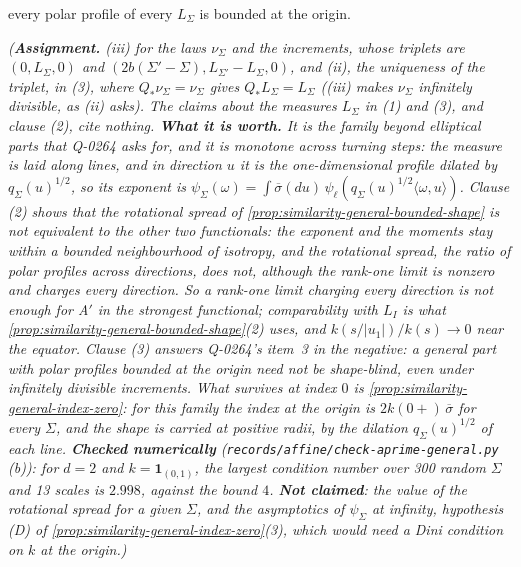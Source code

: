 \begin{proposition}
\begin{enumerate}
every polar profile of every $L_\Sigma$ is bounded at the origin.
\end{enumerate}
\statusA\quad{}\quad\emph{(\textbf{Assignment.} (iii) for the laws $\nu_\Sigma$ and the
increments, whose triplets are $(0, L_\Sigma, 0)$ and $(2b(\Sigma' - \Sigma), L_{\Sigma'} - L_\Sigma, 0)$, and (ii), the
uniqueness of the triplet, in (3), where $Q_*\nu_\Sigma = \nu_\Sigma$ gives $Q_*L_\Sigma = L_\Sigma$ ((iii) makes
$\nu_\Sigma$ infinitely divisible, as (ii) asks). The claims about the measures $L_\Sigma$ in (1) and (3), and
clause (2), cite nothing. \textbf{What it is worth.} It is the family beyond
elliptical parts that Q-0264 asks for, and it is monotone across turning steps: the \Levy{} measure is
laid along lines, and in direction $u$ it is the one-dimensional profile dilated by $q_\Sigma(u)^{1/2}$, so
its exponent is $\psi_\Sigma(\omega) = \int\overline\sigma(du)\,\psi_\ell(q_\Sigma(u)^{1/2}\langle\omega,u\rangle)$. Clause (2)
shows that the rotational spread of \ref{prop:similarity-general-bounded-shape} is not equivalent to
the other two functionals: the
exponent and the moments stay within a bounded neighbourhood of isotropy, and the rotational spread,
the ratio of polar profiles across directions, does not, although the rank-one limit is nonzero and
charges every direction. So a rank-one limit charging every direction is not enough for A$'$ in the
strongest functional; comparability with $L_I$ is what \ref{prop:similarity-general-bounded-shape}(2)
uses, and $k(s/|u_1|)/k(s) \to 0$ near the equator. Clause (3) answers Q-0264's item~3 in the negative:
a general part with polar profiles bounded at the origin need not be shape-blind, even under infinitely
divisible increments. What survives at index $0$ is \ref{prop:similarity-general-index-zero}: for this
family the index at the origin is $2k(0{+})\,\overline\sigma$ for every $\Sigma$, and the shape is carried at
positive radii, by the dilation $q_\Sigma(u)^{1/2}$ of each line. \textbf{Checked numerically}
(\texttt{records/affine/check-aprime-general.py} (b)): for $d = 2$ and $k = \mathbf 1_{(0,1)}$, the largest
condition number over 300 random $\Sigma$ and 13 scales is $2.998$, against the bound $4$. \textbf{Not
claimed}: the value of the rotational spread for a given $\Sigma$, and the asymptotics of $\psi_\Sigma$ at
infinity, hypothesis (D) of \ref{prop:similarity-general-index-zero}(3), which would need a Dini
condition on $k$ at the origin.)}
\end{proposition}

